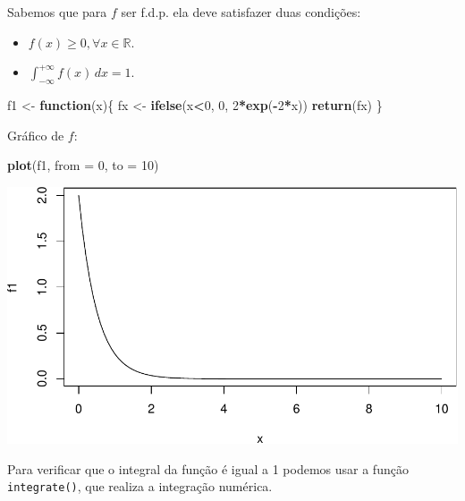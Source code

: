 \documentclass[
]{book}
\newenvironment{Shaded}{\begin{snugshade}}{\end{snugshade}}
\newcommand{\AttributeTok}[1]{\textcolor[rgb]{0.13,0.29,0.53}{#1}}
\newcommand{\ControlFlowTok}[1]{\textcolor[rgb]{0.13,0.29,0.53}{\textbf{#1}}}
\newcommand{\DecValTok}[1]{\textcolor[rgb]{0.00,0.00,0.81}{#1}}
\newcommand{\FunctionTok}[1]{\textcolor[rgb]{0.13,0.29,0.53}{\textbf{#1}}}
\newcommand{\NormalTok}[1]{#1}
\newcommand{\OtherTok}[1]{\textcolor[rgb]{0.56,0.35,0.01}{#1}}
\newcommand{\SpecialCharTok}[1]{\textcolor[rgb]{0.81,0.36,0.00}{\textbf{#1}}}
\providecommand{\tightlist}{%
  \setlength{\itemsep}{0pt}\setlength{\parskip}{0pt}}
\begin{document}
Sabemos que para \(f\) ser f.d.p. ela deve satisfazer duas condições:

\begin{itemize}
\tightlist
\item
  \(f(x)\geq 0, \forall x \in \mathbb{R}\).
\item
  \(\int_{-\infty}^{+\infty}f(x)\, dx = 1\).
\end{itemize}

\begin{Shaded}
\begin{Highlighting}[]
\NormalTok{f1 }\OtherTok{\textless{}{-}} \ControlFlowTok{function}\NormalTok{(x)\{}
\NormalTok{  fx }\OtherTok{\textless{}{-}} \FunctionTok{ifelse}\NormalTok{(x}\SpecialCharTok{\textless{}}\DecValTok{0}\NormalTok{, }\DecValTok{0}\NormalTok{, }\DecValTok{2}\SpecialCharTok{*}\FunctionTok{exp}\NormalTok{(}\SpecialCharTok{{-}}\DecValTok{2}\SpecialCharTok{*}\NormalTok{x))}
  \FunctionTok{return}\NormalTok{(fx)}
\NormalTok{\}}
\end{Highlighting}
\end{Shaded}

Gráfico de \(f\):

\begin{Shaded}
\begin{Highlighting}[]
\FunctionTok{plot}\NormalTok{(f1, }\AttributeTok{from =} \DecValTok{0}\NormalTok{, }\AttributeTok{to =} \DecValTok{10}\NormalTok{)}
\end{Highlighting}
\end{Shaded}

\includegraphics{introR_files/figure-latex/unnamed-chunk-235-1.pdf}

Para verificar que o integral da função é igual a 1 podemos usar a função \texttt{integrate()}, que realiza a integração numérica.
\end{document}
